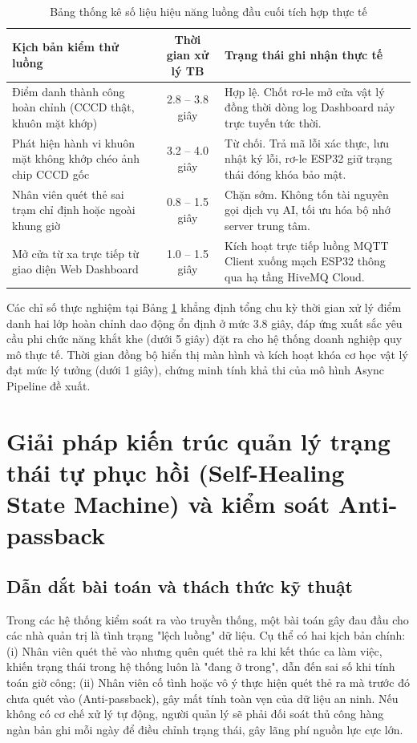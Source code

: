 \documentclass[../DoAn.tex]{subfiles}
\begin{document}
\begin{table}[ht!]
\centering
\small
\renewcommand{\arraystretch}{1.3}
\caption{Bảng thống kê số liệu hiệu năng luồng đầu cuối tích hợp thực tế}
\label{tab:e2e_metrics}
\begin{tabular}{|p{5.5cm}|c|p{6.5cm}|}
\hline
\textbf{Kịch bản kiểm thử luồng} & \textbf{Thời gian xử lý TB} & \textbf{Trạng thái ghi nhận thực tế} \\ \hline
Điểm danh thành công hoàn chỉnh (CCCD thật, khuôn mặt khớp) & 2.8 -- 3.8 giây & Hợp lệ. Chốt rơ-le mở cửa vật lý đồng thời dòng log Dashboard nảy trực tuyến tức thời. \\ \hline
Phát hiện hành vi khuôn mặt không khớp chéo ảnh chip CCCD gốc & 3.2 -- 4.0 giây & Từ chối. Trả mã lỗi xác thực, lưu nhật ký lỗi, rơ-le ESP32 giữ trạng thái đóng khóa bảo mật. \\ \hline
Nhân viên quét thẻ sai trạm chỉ định hoặc ngoài khung giờ & 0.8 -- 1.5 giây & Chặn sớm. Không tốn tài nguyên gọi dịch vụ AI, tối ưu hóa bộ nhớ server trung tâm. \\ \hline
Mở cửa từ xa trực tiếp từ giao diện Web Dashboard & 1.0 -- 1.5 giây & Kích hoạt trực tiếp luồng MQTT Client xuống mạch ESP32 thông qua hạ tầng HiveMQ Cloud. \\ \hline
\end{tabular}
\end{table}

Các chỉ số thực nghiệm tại Bảng \ref{tab:e2e_metrics} khẳng định tổng chu kỳ thời gian xử lý điểm danh hai lớp hoàn chỉnh dao động ổn định ở mức 3.8 giây, đáp ứng xuất sắc yêu cầu phi chức năng khắt khe (dưới 5 giây) đặt ra cho hệ thống doanh nghiệp quy mô thực tế. Thời gian đồng bộ hiển thị màn hình và kích hoạt khóa cơ học vật lý đạt mức lý tưởng (dưới 1 giây), chứng minh tính khả thi của mô hình Async Pipeline đề xuất.

\section{Giải pháp kiến trúc quản lý trạng thái tự phục hồi (Self-Healing State Machine) và kiểm soát Anti-passback}
\label{section:5.3}

\subsection{Dẫn dắt bài toán và thách thức kỹ thuật}

Trong các hệ thống kiểm soát ra vào truyền thống, một bài toán gây đau đầu cho các nhà quản trị là tình trạng "lệch luồng" dữ liệu. Cụ thể có hai kịch bản chính: (i) Nhân viên quét thẻ vào nhưng quên quét thẻ ra khi kết thúc ca làm việc, khiến trạng thái trong hệ thống luôn là "đang ở trong", dẫn đến sai số khi tính toán giờ công; (ii) Nhân viên cố tình hoặc vô ý thực hiện quét thẻ ra mà trước đó chưa quét vào (Anti-passback), gây mất tính toàn vẹn của dữ liệu an ninh. Nếu không có cơ chế xử lý tự động, người quản lý sẽ phải đối soát thủ công hàng ngàn bản ghi mỗi ngày để điều chỉnh trạng thái, gây lãng phí nguồn lực cực lớn.
\end{document}
